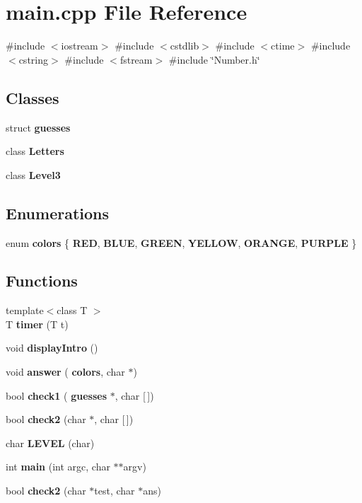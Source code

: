 \section{main.\+cpp File Reference}
\label{main_8cpp}
{\ttfamily \#include $<$iostream$>$}\newline
{\ttfamily \#include $<$cstdlib$>$}\newline
{\ttfamily \#include $<$ctime$>$}\newline
{\ttfamily \#include $<$cstring$>$}\newline
{\ttfamily \#include $<$fstream$>$}\newline
{\ttfamily \#include \char`\"{}Number.\+h\char`\"{}}\newline
\subsection*{Classes}
\begin{DoxyCompactItemize}
\item 
struct \textbf{ guesses}
\item 
class \textbf{ Letters}
\item 
class \textbf{ Level3}
\end{DoxyCompactItemize}
\subsection*{Enumerations}
\begin{DoxyCompactItemize}
\item 
enum \textbf{ colors} \{ \newline
\textbf{ R\+ED}, 
\textbf{ B\+L\+UE}, 
\textbf{ G\+R\+E\+EN}, 
\textbf{ Y\+E\+L\+L\+OW}, 
\newline
\textbf{ O\+R\+A\+N\+GE}, 
\textbf{ P\+U\+R\+P\+LE}
 \}
\end{DoxyCompactItemize}
\subsection*{Functions}
\begin{DoxyCompactItemize}
\item 
{\footnotesize template$<$class T $>$ }\\T \textbf{ timer} (T t)
\item 
void \textbf{ display\+Intro} ()
\item 
void \textbf{ answer} (\textbf{ colors}, char $\ast$)
\item 
bool \textbf{ check1} (\textbf{ guesses} $\ast$, char [$\,$])
\item 
bool \textbf{ check2} (char $\ast$, char [$\,$])
\item 
char \textbf{ L\+E\+V\+EL} (char)
\item 
int \textbf{ main} (int argc, char $\ast$$\ast$argv)
\item 
bool \textbf{ check2} (char $\ast$test, char $\ast$ans)
\end{DoxyCompactItemize}

